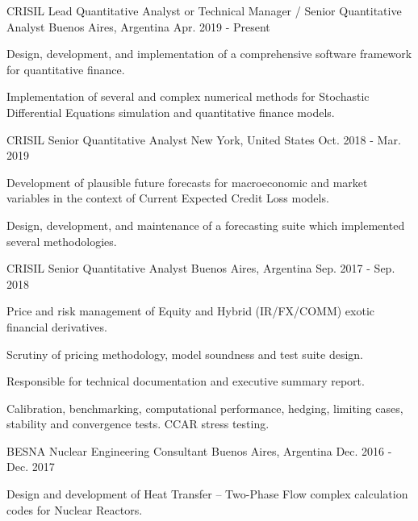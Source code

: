 
\begin{cventries}

  \cventry
    {CRISIL}
    {Lead Quantitative Analyst or Technical Manager / Senior Quantitative Analyst}
    {Buenos Aires, Argentina}
    {Apr. 2019 - Present}
    {
      \begin{cvitems}
        \item{Design, development, and implementation of a comprehensive software framework for quantitative finance.}
        \item{Implementation of several and complex numerical methods for Stochastic Differential Equations simulation and quantitative finance models.}
      \end{cvitems}
      \vspace{1em}
    }

  \cventry
    {CRISIL}
    {Senior Quantitative Analyst}
    {New York, United States}
    {Oct. 2018 - Mar. 2019}
    {
      \begin{cvitems}
        \item{Development of plausible future forecasts for macroeconomic and market variables in the context of Current Expected Credit Loss models.}
        \item{Design, development, and maintenance of a forecasting suite which implemented several methodologies.}
      \end{cvitems}
      \vspace{1em}
    }

  \cventry
    {CRISIL}
    {Senior Quantitative Analyst}
    {Buenos Aires, Argentina}
    {Sep. 2017 - Sep. 2018}
    {
      \begin{cvitems}
        \item{Price and risk management of Equity and Hybrid (IR/FX/COMM) exotic financial derivatives.}
        \item{Scrutiny of pricing methodology, model soundness and test suite design.}
        \item{Responsible for technical documentation and executive summary report.}
        \item{Calibration, benchmarking, computational performance, hedging, limiting cases, stability and convergence tests. CCAR stress testing.}
      \end{cvitems}
      \vspace{1em}
    }

  \cventry
    {BESNA}
    {Nuclear Engineering Consultant}
    {Buenos Aires, Argentina}
    {Dec. 2016 - Dec. 2017}
    {
      \begin{cvitems}
        \item{Design and development of Heat Transfer – Two-Phase Flow complex calculation codes for Nuclear Reactors.}
      \end{cvitems}
      \vspace{1em}
    }


\end{cventries}
